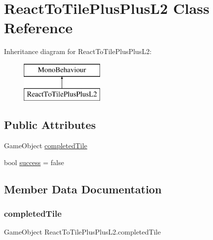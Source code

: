\hypertarget{class_react_to_tile_plus_plus_l2}{}\section{React\+To\+Tile\+Plus\+Plus\+L2 Class Reference}
\label{class_react_to_tile_plus_plus_l2}
Inheritance diagram for React\+To\+Tile\+Plus\+Plus\+L2\+:\begin{figure}[H]
\begin{center}
\leavevmode
\includegraphics[height=2.000000cm]{class_react_to_tile_plus_plus_l2}
\end{center}
\end{figure}
\subsection*{Public Attributes}
\begin{DoxyCompactItemize}
\item 
Game\+Object \hyperlink{class_react_to_tile_plus_plus_l2_a44a514e4e300de5067a9d66fff87714f}{completed\+Tile}
\item 
bool \hyperlink{class_react_to_tile_plus_plus_l2_a890aad65cf350e2bd1cdd483924e11e7}{success} = false
\end{DoxyCompactItemize}


\subsection{Member Data Documentation}
\mbox{\label{class_react_to_tile_plus_plus_l2_a44a514e4e300de5067a9d66fff87714f}} 
\subsubsection{\texorpdfstring{completed\+Tile}{completedTile}}
{\footnotesize\ttfamily Game\+Object React\+To\+Tile\+Plus\+Plus\+L2.\+completed\+Tile}

\mbox{\label{class_react_to_tile_plus_plus_l2_a890aad65cf350e2bd1cdd483924e11e7}} 
